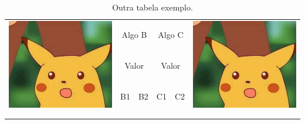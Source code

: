\begin{table}[h!]
	\centering
	\begin{tabular}{|c|c|c|c|c|c|}
		\hline
		\multirow{3}{*}{\includegraphics[trim = {0cm 0cm 0cm 0cm}, clip , scale = 0.03]{midia/exemplo}} & \multicolumn{2}{c|}{Algo B} & %
		\multicolumn{2}{c|}{Algo C} & \multirow{3}{*}{\includegraphics[trim = {0cm 0cm 0cm 0cm}, clip , scale = 0.03]{midia/exemplo}}\\
		\cline{2-5}
		& \multicolumn{2}{c|}{Valor} & \multicolumn{2}{c|}{Valor} & \\
		\cline{2-5}
		& B1 & B2 & C1 & C2 & \\
		\hline
		& & & & & \\
		\hline
		& & & & & \\
		\hline
	\end{tabular}
	\caption{Outra tabela exemplo.}
\end{table}


